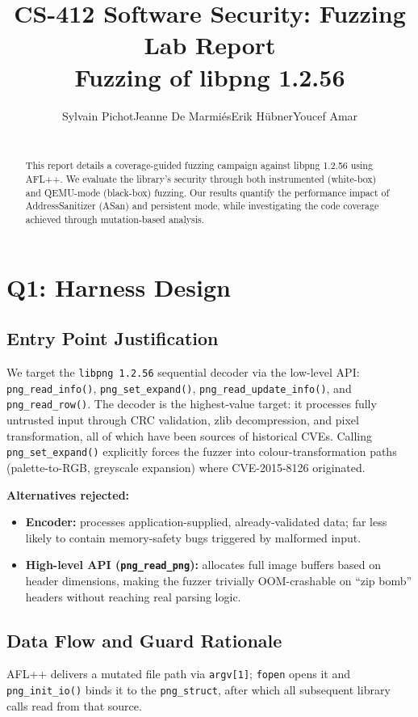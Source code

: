 \documentclass[letterpaper,twocolumn,10pt]{article}
\date{} %
\title{\Large \bf CS-412 Software Security: Fuzzing Lab Report \\ Fuzzing of libpng 1.2.56}
\author{
\begin{tabular}{cccc}
{\rm Sylvain Pichot} & {\rm Jeanne De Marmiés} & {\rm Erik Hübner} & {\rm Youcef Amar}
\end{tabular}
\\[0.5em]
{\rm \makebox[\linewidth][c]{\href{https://github.com/2Fick/fuzz-busters-cs412-fuzzing-lab}{GitHub Repository Link}}}
}
\begin{document}
\maketitle

\begin{abstract}
This report details a coverage-guided fuzzing campaign against libpng 1.2.56 using AFL++. We evaluate the library's security through both instrumented (white-box) and QEMU-mode (black-box) fuzzing. Our results quantify the performance impact of AddressSanitizer (ASan) and persistent mode, while investigating the code coverage achieved through mutation-based analysis.
\end{abstract}

\section{Q1: Harness Design}

\subsection{Entry Point Justification}
We target the \texttt{libpng 1.2.56} sequential decoder via the low-level API:
\texttt{png\_read\_info()}, \texttt{png\_set\_expand()},
\texttt{png\_read\_update\_info()}, and \texttt{png\_read\_row()}.
The decoder is the highest-value target: it processes fully untrusted input
through CRC validation, zlib decompression, and pixel transformation, all of
which have been sources of historical CVEs. Calling \texttt{png\_set\_expand()}
explicitly forces the fuzzer into colour-transformation paths (palette-to-RGB,
greyscale expansion) where CVE-2015-8126 originated.

\textbf{Alternatives rejected:}
\begin{itemize}[leftmargin=*]
    \item \textbf{Encoder:} processes application-supplied, already-validated data;
    far less likely to contain memory-safety bugs triggered by malformed input.
    \item \textbf{High-level API (\texttt{png\_read\_png}):} allocates full image
    buffers based on header dimensions, making the fuzzer trivially OOM-crashable
    on ``zip bomb'' headers without reaching real parsing logic.
\end{itemize}

\subsection{Data Flow and Guard Rationale}
AFL++ delivers a mutated file path via \texttt{argv[1]}; \texttt{fopen} opens it
and \texttt{png\_init\_io()} binds it to the \texttt{png\_struct}, after which all
subsequent library calls read from that source.
\end{document}
